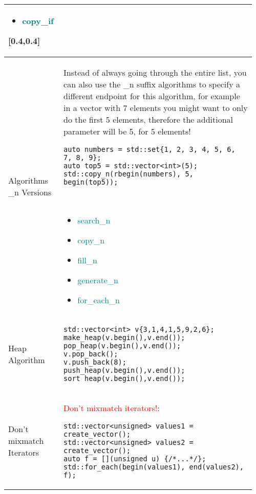 \documentclass[main.tex,fontsize=8pt,paper=a4,paper=portrait,DIV=calc,]{scrartcl}
\begin{document}
\begin{table}[ht!]
\begin{tabular}{|m{0.2\linewidth}|m{0.755\linewidth}|}
{\begin{itemize}
\item \textcolor{teal}{copy\_if}
\end{itemize} 
}[0.4,0.4]\\
\hline
Algorithms \_n Versions & 
Instead of always going through the entire list, you can also use the \_n suffix algorithms to specify a different endpoint for this algorithm, for example in a vector with 7 elements you might want to only do the first 5 elements, therefore the additional parameter will be 5, for 5 elements!\newline
\begin{lstlisting}
auto numbers = std::set{1, 2, 3, 4, 5, 6, 7, 8, 9};
auto top5 = std::vector<int>(5);
std::copy_n(rbegin(numbers), 5, begin(top5));
\end{lstlisting}
\, \newline
\begin{itemize}
\item \textcolor{teal}{search\_n}
\item \textcolor{teal}{copy\_n}
\item \textcolor{teal}{fill\_n}
\item \textcolor{teal}{generate\_n}
\item \textcolor{teal}{for\_each\_n}
\vspace{-3mm}
\end{itemize}\\ 
\hline
Heap Algorithm & 
\begin{lstlisting}
std::vector<int> v{3,1,4,1,5,9,2,6};
make_heap(v.begin(),v.end());
pop_heap(v.begin(),v.end());
v.pop_back();
v.push_back(8);
push_heap(v.begin(),v.end());
sort_heap(v.begin(),v.end());
\end{lstlisting}\\
\hline
Don't mixmatch Iterators & 
\textcolor{red}{Don't mixmatch iterators!}:\newline
\begin{lstlisting}
std::vector<unsigned> values1 = create_vector();
std::vector<unsigned> values2 = create_vector();
auto f = [](unsigned u) {/*...*/};
std::for_each(begin(values1), end(values2), f);
\end{lstlisting}
\\
\hline
\end{tabular}
\end{table}
\pagebreak
\end{document}
